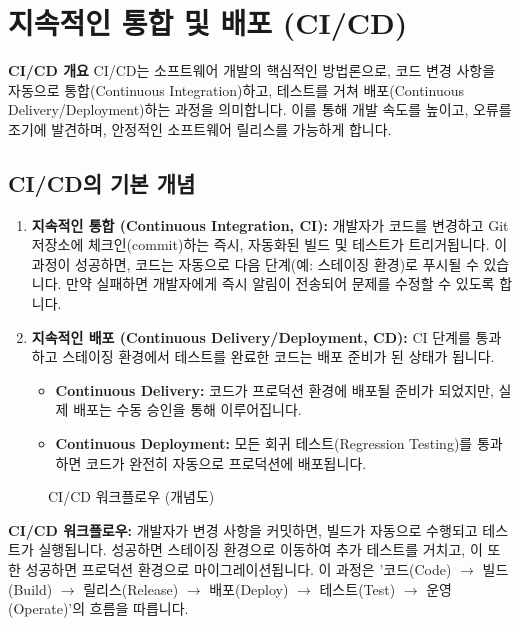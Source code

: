 \documentclass[11pt,a4paper]{article}
\theoremstyle{definition}
\begin{document}
\newpage
\section{지속적인 통합 및 배포 (CI/CD)}

\begin{tcolorbox}[conceptbox] %
\textbf{CI/CD 개요}
CI/CD는 소프트웨어 개발의 핵심적인 방법론으로, 코드 변경 사항을 자동으로 통합(Continuous Integration)하고, 테스트를 거쳐 배포(Continuous Delivery/Deployment)하는 과정을 의미합니다. 이를 통해 개발 속도를 높이고, 오류를 조기에 발견하며, 안정적인 소프트웨어 릴리스를 가능하게 합니다.
\end{tcolorbox}

\subsection{CI/CD의 기본 개념}
\begin{enumerate}
    \item \textbf{지속적인 통합 (Continuous Integration, CI):}
    개발자가 코드를 변경하고 Git 저장소에 체크인(commit)하는 즉시, 자동화된 빌드 및 테스트가 트리거됩니다. 이 과정이 성공하면, 코드는 자동으로 다음 단계(예: 스테이징 환경)로 푸시될 수 있습니다. 만약 실패하면 개발자에게 즉시 알림이 전송되어 문제를 수정할 수 있도록 합니다.

    \item \textbf{지속적인 배포 (Continuous Delivery/Deployment, CD):}
    CI 단계를 통과하고 스테이징 환경에서 테스트를 완료한 코드는 배포 준비가 된 상태가 됩니다.
    \begin{itemize}
        \item \textbf{Continuous Delivery:} 코드가 프로덕션 환경에 배포될 준비가 되었지만, 실제 배포는 수동 승인을 통해 이루어집니다.
        \item \textbf{Continuous Deployment:} 모든 회귀 테스트(Regression Testing)를 통과하면 코드가 완전히 자동으로 프로덕션에 배포됩니다.
    \end{itemize}
\end{enumerate}

\begin{figure}[h!]
    \centering
    \caption{CI/CD 워크플로우 (개념도)}
    \label{fig:ci_cd_flow}
\end{figure}

\textbf{CI/CD 워크플로우:}
개발자가 변경 사항을 커밋하면, 빌드가 자동으로 수행되고 테스트가 실행됩니다. 성공하면 스테이징 환경으로 이동하여 추가 테스트를 거치고, 이 또한 성공하면 프로덕션 환경으로 마이그레이션됩니다. 이 과정은 '코드(Code) $\rightarrow$ 빌드(Build) $\rightarrow$ 릴리스(Release) $\rightarrow$ 배포(Deploy) $\rightarrow$ 테스트(Test) $\rightarrow$ 운영(Operate)'의 흐름을 따릅니다.
\end{document}
